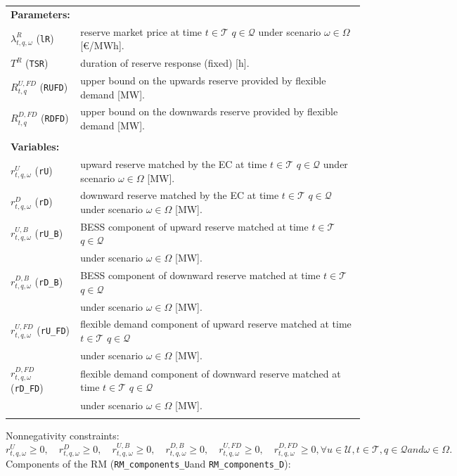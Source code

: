 \begin{tabularx}{\textwidth}{l X}   
    \textbf{Parameters:} \\
    	$\lambda^{R}_{t,q, \omega}$ (\texttt{lR}) & reserve market price at time $t \in \mathcal{T}$ $q \in \mathcal{Q}$ under scenario $\omega \in \Omega$ [\euro/MWh]. \\
    	$T^R$ (\texttt{TSR}) & duration of reserve response (fixed) [h]. \\
    	$R^{U, FD}_{t,q}$ (\texttt{RUFD}) & upper bound on the upwards reserve provided by flexible demand [MW]. \\
    	$R^{D, FD}_{t,q}$ (\texttt{RDFD}) & upper bound on the downwards reserve provided by flexible demand [MW]. \\
    \\
       
    \textbf{Variables:} \\
	$r^{U}_{t,q, \omega}$ (\texttt{rU}) & upward reserve matched by the EC at time $t \in \mathcal{T}$ $q \in \mathcal{Q}$ under scenario $\omega \in \Omega$ [MW]. \\
    $r^{D}_{t,q, \omega}$ (\texttt{rD}) & downward reserve matched by the EC at time $t \in \mathcal{T}$ $q \in \mathcal{Q}$ under scenario $\omega \in \Omega$ [MW]. \\
    $r^{U, B}_{t,q, \omega}$ (\texttt{rU\_B}) & BESS component of upward reserve matched at time $t \in \mathcal{T}$ $q \in \mathcal{Q}$\\
    & under scenario $\omega \in \Omega$ [MW]. \\
    $r^{D, B}_{t,q, \omega}$ (\texttt{rD\_B}) & BESS component of downward reserve matched at time $t \in \mathcal{T}$ $q \in \mathcal{Q}$\\
    & under scenario $\omega \in \Omega$ [MW]. \\
    $r^{U, FD}_{t,q, \omega}$ (\texttt{rU\_FD}) & flexible demand component of upward reserve matched at time $t \in \mathcal{T}$ $q \in \mathcal{Q}$\\
    & under scenario $\omega \in \Omega$ [MW]. \\
    $r^{D, FD}_{t,q, \omega}$ (\texttt{rD\_FD}) & flexible demand component of downward reserve matched at time $t \in \mathcal{T}$ $q \in \mathcal{Q}$\\
    & under scenario $\omega \in \Omega$ [MW]. \\
    \\
\end{tabularx}

Nonnegativity constraints:
\begin{equation} \label{EQ:RVarDef2}
    r^{U}_{t,q, \omega} \geq 0, \quad r^{D}_{t,q, \omega} \geq 0, \quad r^{U, B}_{t,q, \omega} \geq 0, \quad r^{D, B}_{t,q, \omega} \geq 0, \quad r^{U, FD}_{t,q, \omega} \geq 0, \quad r^{D, FD}_{t,q, \omega} \geq 0, \forall u \in \mathcal{U}, t \in \mathcal{T}, q \in \mathcal{Q} and \omega \in \Omega. 
\end{equation}
Components of the RM (\verb|RM_components_U|and \verb|RM_components_D|):

